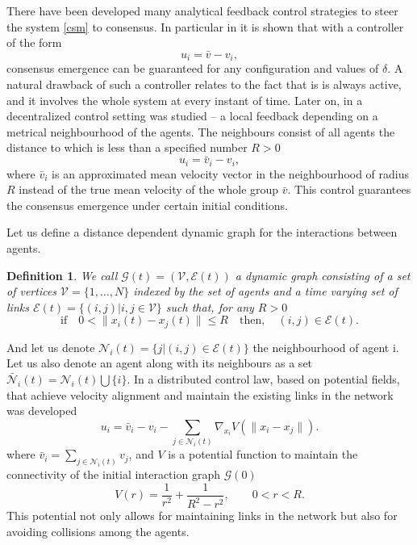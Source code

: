 \documentclass[a4paper, english]{article}
\newtheorem{dfn}{Definition}[section]
\begin{document}
There have been developed many analytical feedback control strategies  to steer the system \eqref{csm} to consensus. In particular in \cite{cftp} it is shown that with a controller
of the form
$$
u_i = \bar{v} - v_i,
$$
consensus emergence can be guaranteed for any configuration and values of $\delta$. A natural drawback of such a controller relates to the fact that is is always active, and it involves the whole system at every
instant of time. Later on,  in \cite{bfk} a decentralized control setting  was studied \--- a local feedback depending on a metrical neighbourhood of the agents. The neighbours consist of all agents
the distance to which is less than a specified number $R>0$
\begin{equation}
u_i = \bar{v}_i - v_i,
\label{bfk}
\end{equation}
where $\bar{v}_i$ is an approximated mean velocity vector in the neighbourhood of radius $R$ instead of the true mean velocity of the whole group $\bar{v}$. This control guarantees the consensus emergence under certain initial conditions.




Let us define a distance dependent dynamic graph for the interactions between agents.
\begin{dfn}
We call $\mathcal{G}(t) =  (\mathcal{V}, \mathcal{E}(t) )$ a dynamic graph consisting of a set of vertices $\mathcal{V} = \{1, \dots,  N\}$ indexed by the set of agents and a time varying set of links
$\mathcal{E}(t) = \{(i, j)|i, j \in \mathcal{V}\}$ such that, for any $R>0$
$$
\mbox{if}\quad 0<\|x_i(t) - x_j(t)\| \leq R \quad\mbox{then},\quad (i, j)\in \mathcal{E}(t).
$$
\end{dfn}
And let us denote $\mathcal{N}_i(t) = \{j|(i, j)\in\mathcal{E}(t)\}$ the neighbourhood of agent i.
Let us also denote an agent along with its neighbours as a set $\bar{\mathcal{N}}_i(t) = \mathcal{N}_i(t)\bigcup \{i\}$.
In \cite{jfwpc} a distributed control law, based on potential fields, that achieve velocity alignment and maintain the existing links in the network was developed
\begin{equation}
u_i = \bar{v}_i - v_i - \sum_{j \in \mathcal{N}_i(t)}\nabla_{x_i}V(\|x_i - x_j\|).
\label{controljad}
\end{equation}
where $\bar{v}_i = \sum_{j \in \mathcal{N}_i(t)} v_j$, and $V$ is a potential function  to maintain the connectivity of the initial interaction graph $\mathcal{G}(0)$
\begin{equation}
 V(r) = \frac{1}{r^2} + \frac{1}{R^2 - r^2}, \qquad 0 < r < R.
\label{potential}
\end{equation}
This potential not only allows for maintaining links in the network but also for avoiding collisions among the agents.
\end{document}
